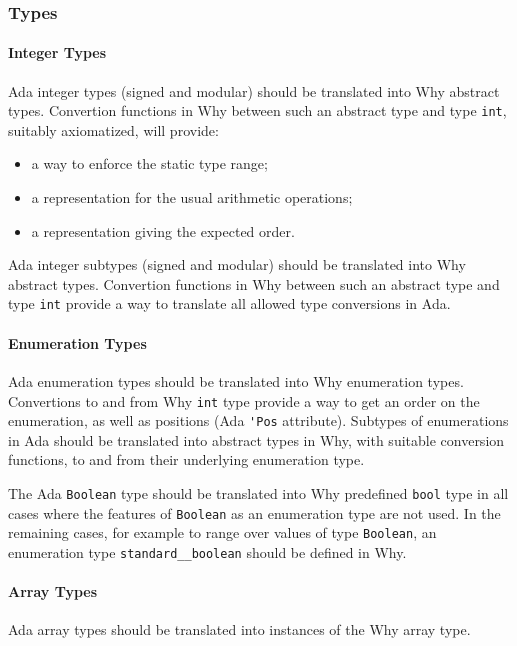 \documentclass{article}
\newcounter{example}
\begin{document}
\subsubsection{Types}

\paragraph{Integer Types}

Ada integer types (signed and modular) should be translated into Why abstract
types. Convertion functions in Why between such an abstract type and type
\verb|int|, suitably axiomatized, will provide:
\begin{itemize}
\item a way to enforce the static type range;
\item a representation for the usual arithmetic operations;
\item a representation giving the expected order.
\end{itemize}

Ada integer subtypes (signed and modular) should be translated into Why
abstract types. Convertion functions in Why between such an abstract type and
type \verb|int| provide a way to translate all allowed type conversions in Ada.
 
\paragraph{Enumeration Types}

Ada enumeration types should be translated into Why enumeration
types. Convertions to and from Why \verb|int| type provide a way to get an
order on the enumeration, as well as positions (Ada \verb|'Pos|
attribute). Subtypes of enumerations in Ada should be translated into abstract
types in Why, with suitable conversion functions, to and from their underlying
enumeration type.

The Ada \verb|Boolean| type should be translated into Why predefined
\verb|bool| type in all cases where the features of \verb|Boolean| as an
enumeration type are not used. In the remaining cases, for example to range
over values of type \verb|Boolean|, an enumeration type
\verb|standard__boolean| should be defined in Why.

\paragraph{Array Types}

Ada array types should be translated into instances of the Why array type. 
\end{document}
